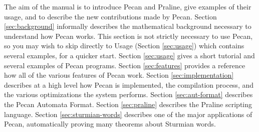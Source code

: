 The aim of the manual is to introduce Pecan and Praline, give examples of their usage, and to describe the new contributions made by Pecan. Section \ref{sec:background} informally describes the mathematical background necessary to understand how Pecan works.
This section is not strictly necessary to use Pecan, so you may wish to skip directly to Usage (Section \ref{sec:usage}) which contains several examples, for a quicker start.
Section \ref{sec:usage} gives a short tutorial and several examples of Pecan programs.
Section \ref{sec:features} provides a reference how all of the various features of Pecan work.
Section \ref{sec:implementation} describes at a high level how Pecan is implemented, the compilation process, and the various optimizations the system performs.
Section \ref{sec:aut-format} describes the Pecan Automata Format.
Section \ref{sec:praline} describes the Praline scripting language.
Section \ref{sec:sturmian-words} describes one of the major applications of Pecan, automatically proving many theorems about Sturmian words.
